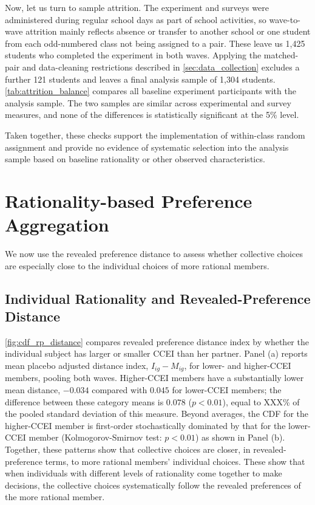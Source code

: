 \documentclass[11 pt]{article}
\begin{document}
Now, let us turn to sample attrition. The experiment and surveys were administered during regular school days as part of school activities, so wave-to-wave attrition mainly reflects absence or transfer to another school or one student from each odd-numbered class not being assigned to a pair. These leave us 1,425 students who completed the experiment in both waves. Applying the matched-pair and data-cleaning restrictions described in \autoref{sec:data_collection} excludes a further 121 students and leaves a final analysis sample of 1,304 students. \autoref{tab:attrition_balance} compares all baseline experiment participants with the analysis sample. The two samples are similar across experimental and survey measures, and none of the differences is statistically significant at the 5\% level.

Taken together, these checks support the implementation of within-class random assignment and provide no evidence of systematic selection into the analysis sample based on baseline rationality or other observed characteristics.


\section{Rationality-based Preference Aggregation}
\label{section:results}
We now use the revealed preference distance to assess whether collective choices are especially close to the individual choices of more rational members.

\subsection{Individual Rationality and Revealed-Preference Distance}\label{sec:main_results}
\autoref{fig:cdf_rp_distance} compares revealed preference distance index by whether the individual subject has larger or smaller CCEI than her partner. Panel (a) reports mean placebo adjusted distance index, $I_{ig}-M_{ig}$, for lower- and higher-CCEI members, pooling both waves. Higher-CCEI members have a substantially lower mean distance, $-0.034$ compared with $0.045$ for lower-CCEI members; the difference between these category means is $0.078$ ($p<0.01$), equal to XXX\% of the pooled standard deviation of this measure. Beyond averages, the CDF for the higher-CCEI member is first-order stochastically dominated by that for the lower-CCEI member (Kolmogorov-Smirnov test: $p<0.01$) as shown in Panel (b). Together, these patterns show that collective choices are closer, in revealed-preference terms, to more rational members' individual choices. These show that when individuals with different levels of rationality come together to make decisions, the collective choices systematically follow the revealed preferences  of the more rational member.
\end{document}
